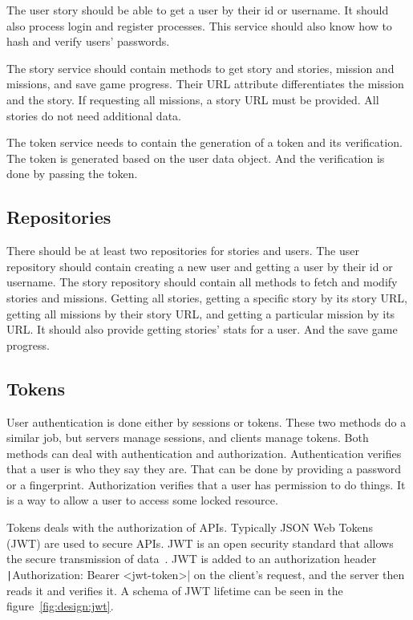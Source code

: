 The user story should be able to get a user by their id or username.
It should also process login and register processes.
This service should also know how to hash and verify users' passwords.

The story service should contain methods to get story and stories, mission and missions, and save game progress.
Their URL attribute differentiates the mission and the story.
If requesting all missions, a story URL must be provided.
All stories do not need additional data.

The token service needs to contain the generation of a token and its verification.
The token is generated based on the user data object.
And the verification is done by passing the token.

\subsection{Repositories}

There should be at least two repositories for stories and users.
The user repository should contain creating a new user and getting a user by their id or username.
The story repository should contain all methods to fetch and modify stories and missions.
Getting all stories, getting a specific story by its story URL, getting all missions by their story URL, and getting a particular mission by its URL.
It should also provide getting stories' stats for a user.
And the save game progress.

\subsection{Tokens}
\label{design:server:tokens}

User authentication is done either by sessions or tokens.
These two methods do a similar job, but servers manage sessions, and clients manage tokens.
Both methods can deal with authentication and authorization.
Authentication verifies that a user is who they say they are.
That can be done by providing a password or a fingerprint.
Authorization verifies that a user has permission to do things.
It is a way to allow a user to access some locked resource.~\cite{lin_2018_tuck}

Tokens deals with the authorization of APIs.
Typically JSON Web Tokens (JWT) are used to secure APIs.
JWT is an open security standard that allows the secure transmission of data~\cite{lin_2018_tuck}.
JWT is added to an authorization header \texttt|Authorization: Bearer <jwt-token>| on the client's request, and the server then reads it and verifies it.
A schema of JWT lifetime can be seen in the figure~\ref{fig:design:jwt}.

